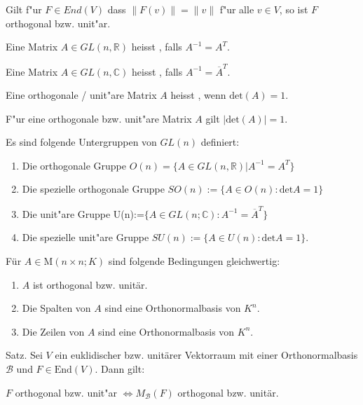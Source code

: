 \documentclass[9pt, a4paper, twocolumn, landscape]{article}
\begin{document}
\begin{lemma}
Gilt f"ur $F \in End(V)$ dass $\|F(v)\| = \|v\|$ f"ur alle $v \in V$, so ist $F$ orthogonal bzw. unit"ar.
\end{lemma}

\begin{definition}
Eine Matrix $A \in GL(n, \mathbb{R})$ heisst , falls
$
A^{-1} = A^T.
$

Eine Matrix $A \in GL(n, \mathbb{C})$ heisst , falls
$
A^{-1} = \overline{A}^T.
$

Eine orthogonale / unit"are Matrix $A$ heisst , wenn $\mathrm{det}(A) = 1$.
\end{definition}

\begin{remark}
F"ur eine orthogonale bzw. unit"are Matrix $A$ gilt $|\mathrm{det}(A)| = 1$.
\end{remark}

\begin{definition}
Es sind folgende Untergruppen von $GL(n)$ definiert:
\begin{enumerate}
\item Die orthogonale Gruppe $O(n) = \{ A \in GL(n, \mathbb{R}) | A^{-1} = A^T \}$
\item Die spezielle orthogonale Gruppe $SO(n):=\{A \in O(n): \mathrm{det} A=1\}$
\item Die unit"are Gruppe U(n):=$\{A \in GL(n ; \mathbb{C}): A^{-1}= \overline{A}^T\}$
\item Die spezielle unit"are Gruppe $SU(n):=\{A \in U(n): \mathrm{det} A=1\}$.
\end{enumerate}

\end{definition}

\begin{remark}
Für \(A \in \mathrm{M}(n \times n ; K)\) sind folgende Bedingungen gleichwertig:
\begin{enumerate}
\item \(A\) ist orthogonal bzw. unitär.
\item Die Spalten von \(A\) sind eine Orthonormalbasis von \(K^{n}\).
\item Die Zeilen von \(A\) sind eine Orthonormalbasis von \(K^{n}\).
\end{enumerate}
\end{remark}


\begin{theorem}
Satz. Sei \(V\) ein euklidischer bzw. unitärer Vektorraum mit einer Orthonormalbasis \(\mathcal{B}\) und \(F \in \mathrm{End}(V)\). Dann gilt:

$F$ orthogonal bzw. unit"ar $\Leftrightarrow M_{\mathcal{B}}(F)$ orthogonal bzw. unitär.
\end{theorem}
\end{document}
